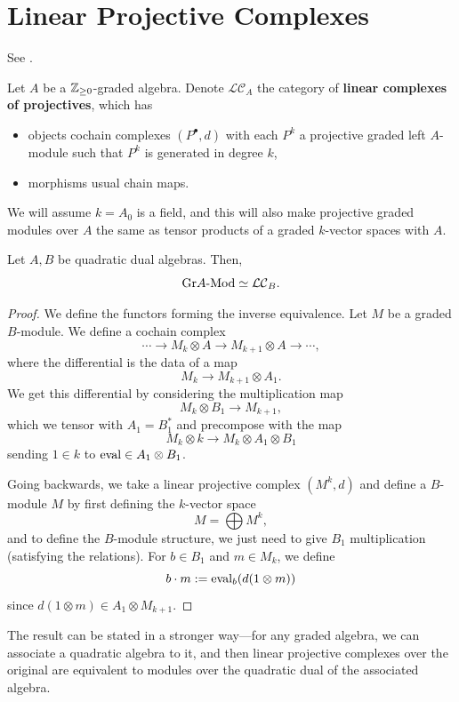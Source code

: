 \documentclass[12pt]{article}
\newcommand{\LCom}{\mathcal{LC}}
\begin{document}
\section{Linear Projective Complexes}

See \cite{Villa_Saorin}.

\begin{defn}
    Let $A$ be a $\mathbb{Z}_{\geq 0}$-graded algebra. Denote $\LCom_A$ the category of \textbf{linear complexes of projectives}, which has
    \begin{itemize}
        \item objects cochain complexes $(P^\bullet, d)$ with each $P^k$ a projective graded left $A$-module such that $P^k$ is generated in degree $k$,
        \item morphisms usual chain maps.
    \end{itemize}
\end{defn}

We will assume $k=A_0$ is a field, and this will also make projective graded modules over $A$ the same as tensor products of a graded $k$-vector spaces with $A$.

\begin{prop}
    Let $A,B$ be quadratic dual algebras. Then,
    \[\grlMod{A} \simeq \LCom_B.\]
\end{prop}
\begin{proof}
    We define the functors forming the inverse equivalence. Let $M$ be a graded $B$-module. We define a cochain complex
    \[\cdots \to M_{k} \otimes A \to M_{k+1} \otimes A \to \cdots,\]
    where the differential is the data of a map
    \[M_{k} \to M_{k+1} \otimes A_1.\]
    We get this differential by considering the multiplication map
    \[M_k \otimes B_1 \to M_{k+1},\]
    which we tensor with $A_1=B_1^*$ and precompose with the map
    \[M_k \otimes k \to M_k \otimes A_1 \otimes B_1\]
    sending $1\in k$ to $\mathrm{eval} \in A_1\otimes B_1$.

    Going backwards, we take a linear projective complex $(M^k,d)$ and define a $B$-module $M$ by first defining the $k$-vector space
    \[M = \bigoplus M^k,\]
    and to define the $B$-module structure, we just need to give $B_1$ multiplication (satisfying the relations). For $b\in B_1$ and $m\in M_k$, we define
    \[b\cdot m := \mathrm{eval}_b(d(1\otimes m))\]
    since $d(1\otimes m) \in A_1 \otimes M_{k+1}$.
\end{proof}

\begin{rmk}
    The result can be stated in a stronger way---for any graded algebra, we can associate a quadratic algebra to it, and then linear projective complexes over the original are equivalent to modules over the quadratic dual of the associated algebra.
\end{rmk}

\nocite{*} %
\end{document}
